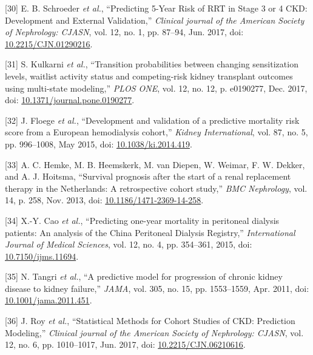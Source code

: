 \documentclass[12pt,PhD,twoside,openright]{muthesis}
\newenvironment{cslreferences}%
  {}%
  {\par}
\begin{document}
\begin{cslreferences}
\leavevmode\hypertarget{ref-schroeder_predicting_2017}{}%
{[}30{]} E. B. Schroeder \emph{et al.}, ``Predicting 5-Year Risk of RRT in Stage 3 or 4 CKD: Development and External Validation,'' \emph{Clinical journal of the American Society of Nephrology: CJASN}, vol. 12, no. 1, pp. 87--94, Jun. 2017, doi: \href{https://doi.org/10.2215/CJN.01290216}{10.2215/CJN.01290216}.

\leavevmode\hypertarget{ref-kulkarni_transition_2017}{}%
{[}31{]} S. Kulkarni \emph{et al.}, ``Transition probabilities between changing sensitization levels, waitlist activity status and competing-risk kidney transplant outcomes using multi-state modeling,'' \emph{PLOS ONE}, vol. 12, no. 12, p. e0190277, Dec. 2017, doi: \href{https://doi.org/10.1371/journal.pone.0190277}{10.1371/journal.pone.0190277}.

\leavevmode\hypertarget{ref-floege_development_2015}{}%
{[}32{]} J. Floege \emph{et al.}, ``Development and validation of a predictive mortality risk score from a European hemodialysis cohort,'' \emph{Kidney International}, vol. 87, no. 5, pp. 996--1008, May 2015, doi: \href{https://doi.org/10.1038/ki.2014.419}{10.1038/ki.2014.419}.

\leavevmode\hypertarget{ref-hemke_survival_2013}{}%
{[}33{]} A. C. Hemke, M. B. Heemskerk, M. van Diepen, W. Weimar, F. W. Dekker, and A. J. Hoitsma, ``Survival prognosis after the start of a renal replacement therapy in the Netherlands: A retrospective cohort study,'' \emph{BMC Nephrology}, vol. 14, p. 258, Nov. 2013, doi: \href{https://doi.org/10.1186/1471-2369-14-258}{10.1186/1471-2369-14-258}.

\leavevmode\hypertarget{ref-cao_predicting_2015}{}%
{[}34{]} X.-Y. Cao \emph{et al.}, ``Predicting one-year mortality in peritoneal dialysis patients: An analysis of the China Peritoneal Dialysis Registry,'' \emph{International Journal of Medical Sciences}, vol. 12, no. 4, pp. 354--361, 2015, doi: \href{https://doi.org/10.7150/ijms.11694}{10.7150/ijms.11694}.

\leavevmode\hypertarget{ref-tangri_predictive_2011}{}%
{[}35{]} N. Tangri \emph{et al.}, ``A predictive model for progression of chronic kidney disease to kidney failure,'' \emph{JAMA}, vol. 305, no. 15, pp. 1553--1559, Apr. 2011, doi: \href{https://doi.org/10.1001/jama.2011.451}{10.1001/jama.2011.451}.

\leavevmode\hypertarget{ref-roy_statistical_2017}{}%
{[}36{]} J. Roy \emph{et al.}, ``Statistical Methods for Cohort Studies of CKD: Prediction Modeling,'' \emph{Clinical journal of the American Society of Nephrology: CJASN}, vol. 12, no. 6, pp. 1010--1017, Jun. 2017, doi: \href{https://doi.org/10.2215/CJN.06210616}{10.2215/CJN.06210616}.


\end{cslreferences}
\end{document}
